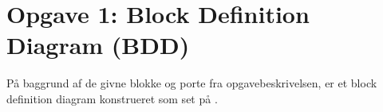 \section{Opgave 1: Block Definition Diagram (BDD)}

På baggrund af de givne blokke og porte fra opgavebeskrivelsen, er et block definition diagram konstrueret som set på .

